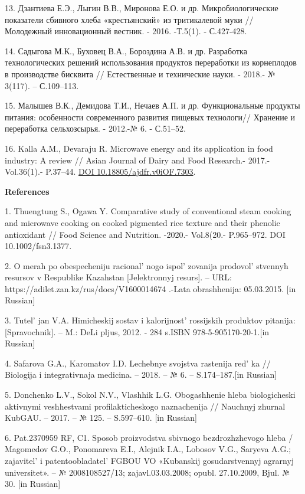 13. Дзантиева Е.Э., Лыгин В.В., Миронова Е.О. и др. Микробиологические
показатели сбивного хлеба «крестьянский» из тритикалевой муки //
Молодежный инновационный вестник. - 2016. -Т.5(1). - С.427-428.

14. Садыгова М.К., Буховец В.А., Бороздина А.В. и др. Разработка
технологических решений использования продуктов переработки из
корнеплодов в производстве бисквита // Естественные и технические науки.
- 2018.- № 3(117). -- С.109--113.

15. Малышев В.К., Демидова Т.И., Нечаев А.П. и др. Функциональные
продукты питания: особенности современного развития пищевых технологи//
Хранение и переработка сельхозсырья. - 2012.-№ 6. - С.51--52.

16. Kalla A.M., Devaraju R. Microwave energy and its application in food
industry: A review // Asian Journal of Dairy and Food Research.- 2017.-
Vol.36(1).- P.37--44.
\href{https://doi.org/10.18805/ajdfr.v0iOF.7303}{DOI
10.18805/ajdfr.v0iOF.7303}.

{\bfseries References}

1. Thuengtung S., Ogawa Y. Comparative study of conventional steam
cooking and microwave cooking on cooked pigmented rice texture and their
phenolic antioxidant // Food Science and Nutrition. -2020.- Vol.8(20.-
P.965--972. DOI 10.1002/fsn3.1377.

2. O merah po obespecheniju racional' nogo
ispol' zovanija prodovol' stvennyh
resursov v Respublike Kazahstan {[}Jelektronnyj resurs{]}. -- URL:
https://adilet.zan.kz/rus/docs/V1600014674 .-Lata obrashhenija:
05.03.2015. {[}in Russian{]}

3. Tutel' jan V.A. Himicheskij sostav i
kalorijnost'{} rossijskih produktov pitanija:
{[}Spravochnik{]}. -- M.: DeLi pljus, 2012. - 284 s.ISBN
978-5-905170-20-1.{[}in Russian{]}

4. Safarova G.A., Karomatov I.D. Lechebnye svojstva rastenija
red' ka // Biologija i integrativnaja medicina. -- 2018.
-- № 6. -- S.174--187.{[}in Russian{]}

5. Donchenko L.V., Sokol N.V., Vlashhik L.G. Obogashhenie hleba
biologicheski aktivnymi veshhestvami profilakticheskogo naznachenija //
Nauchnyj zhurnal KubGAU. -- 2017. -- № 125. -- S.597--610. {[}in
Russian{]}

6. Pat.2370959 RF, C1. Sposob proizvodstva sbivnogo bezdrozhzhevogo
hleba / Magomedov G.O., Ponomareva E.I., Alejnik I.A., Lobosov V.G.,
Saryeva A.G.; zajavitel'{} i
patentoobladatel'{} FGBOU VO «Kubanskij gosudarstvennyj
agrarnyj universitet». -- № 2008108527/13; zajavl.03.03.2008; opubl.
27.10.2009, Bjul. № 30. {[}in Russian{]}

